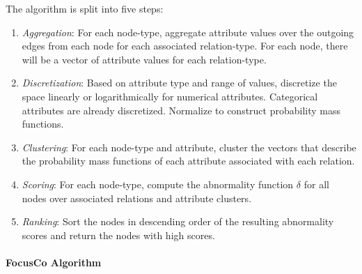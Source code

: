 \documentclass[11pt, oneside]{article}   	%
\begin{document}
\quad The algorithm \cite{edgecentric} is split into five steps:
\begin{enumerate}
\item \emph{Aggregation}: For each node-type, aggregate attribute values over the outgoing edges from each node for each associated relation-type.
For each node, there will be a vector of attribute values for each relation-type.
\item \emph{Discretization}: Based on attribute type and range of values, discretize the space linearly or logarithmically for numerical attributes.
Categorical attributes are already discretized.
Normalize to construct probability mass functions.
\item \emph{Clustering}: For each node-type and attribute, cluster the vectors that describe the probability mass functions of each attribute associated with each relation.
\item \emph{Scoring}: For each node-type, compute the abnormality function $\delta$ for all nodes over associated relations and attribute clusters.
\item \emph{Ranking}: Sort the nodes in descending order of the resulting abnormality scores and return the nodes with high scores.
\end{enumerate}

\paragraph{FocusCo Algorithm}
\quad
\end{document}
